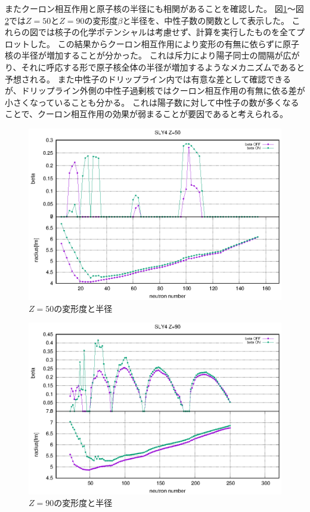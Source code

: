 \documentclass[12pt]{jarticle}
\begin{document}
またクーロン相互作用と原子核の半径にも相関があることを確認した。
図\ref{fig:multi_SLY4_beta_radius_Z=50.eps}～図\ref{fig:multi_SLY4_beta_radius_Z=90.eps}では$Z=50$と$Z=90$の変形度$\beta$と半径を、中性子数の関数として表示した。
これらの図では核子の化学ポテンシャルは考慮せず、計算を実行したものを全てプロットした。
この結果からクーロン相互作用により変形の有無に依らずに原子核の半径が増加することが分かった。
これは斥力により陽子同士の間隔が広がり、それに呼応する形で原子核全体の半径が増加するようなメカニズムであると予想される。
また中性子のドリップライン内では有意な差として確認できるが、ドリップライン外側の中性子過剰核ではクーロン相互作用の有無に依る差が小さくなっていることも分かる。
これは陽子数に対して中性子の数が多くなることで、クーロン相互作用の効果が弱まることが要因であると考えられる。
\begin{figure}[H]
    \centering
    \includegraphics{../multi_SLY4_beta_radius_Z=50.eps}
    \setlength\floatsep{0pt}
    \caption{$Z=50$の変形度と半径}\label{fig:multi_SLY4_beta_radius_Z=50.eps}
\end{figure}
\begin{figure}[H]
    \centering
    \includegraphics{../multi_SLY4_beta_radius_Z=90.eps}
    \setlength\floatsep{0pt}
    \caption{$Z=90$の変形度と半径}\label{fig:multi_SLY4_beta_radius_Z=90.eps}
\end{figure}
\end{document}
